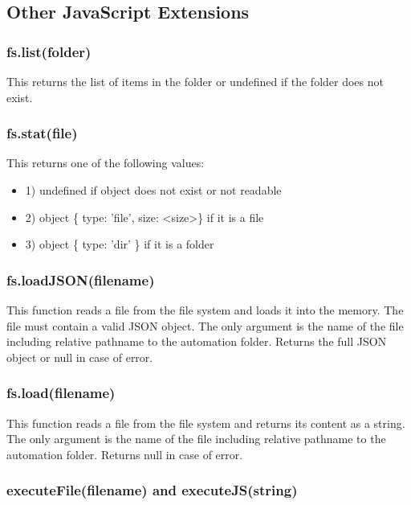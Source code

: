 \subsection{Other JavaScript Extensions}

\subsubsection{fs.list(folder)}

This returns the list of items in the folder or undefined if the folder does not exist.


\subsubsection{fs.stat(file)}

This returns one of the following values:

\begin{itemize}
\item 1) undefined if object does not exist or not readable
\item 2) object \{ type: 'file', size: \textless{}size\textgreater{}\} if it is a file
\item 3) object \{ type: 'dir' \} if it is a folder
\end{itemize} 


\subsubsection{fs.loadJSON(filename)}

This function reads a file from the file system and loads it into the memory. The file 
must contain a valid JSON object. The only argument is the name of the file including 
relative pathname to the automation folder. Returns the full JSON object or null in case of error.

\subsubsection{fs.load(filename)}

This function reads a file from the file system and returns its content as a string. The 
only argument is the name of the file including relative pathname to the automation folder.
Returns null in case of error.

\subsubsection{executeFile(filename) and executeJS(string)}

